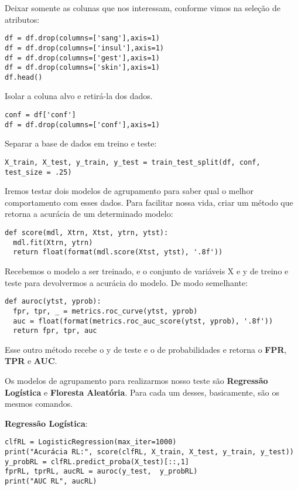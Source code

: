 Deixar somente as colunas que nos interessam, conforme vimos na seleção de atributos:
\begin{lstlisting}
df = df.drop(columns=['sang'],axis=1)
df = df.drop(columns=['insul'],axis=1)
df = df.drop(columns=['gest'],axis=1)
df = df.drop(columns=['skin'],axis=1)
df.head()
\end{lstlisting}

Isolar a coluna alvo e retirá-la dos dados. 
\begin{lstlisting}
conf = df['conf']
df = df.drop(columns=['conf'],axis=1)
\end{lstlisting}

Separar a base de dados em treino e teste:
\begin{lstlisting}
X_train, X_test, y_train, y_test = train_test_split(df, conf, test_size = .25)
\end{lstlisting}

Iremos testar dois modelos de agrupamento para saber qual o melhor comportamento com esses dados. Para facilitar nossa vida, criar um método que retorna a acurácia de um determinado modelo:
\begin{lstlisting}
def score(mdl, Xtrn, Xtst, ytrn, ytst):
  mdl.fit(Xtrn, ytrn)
  return float(format(mdl.score(Xtst, ytst), '.8f'))
\end{lstlisting}

Recebemos o modelo a ser treinado, e o conjunto de variáveis X e y de treino e teste para devolvermos a acurácia do modelo. De modo semelhante:
\begin{lstlisting}
def auroc(ytst, yprob):
  fpr, tpr, _ = metrics.roc_curve(ytst, yprob)
  auc = float(format(metrics.roc_auc_score(ytst, yprob), '.8f'))
  return fpr, tpr, auc 
\end{lstlisting}

Esse outro método recebe o y de teste e o de probabilidades e retorna o \textbf{FPR}, \textbf{TPR} e \textbf{AUC}.

Os modelos de agrupamento para realizarmos nosso teste são \textbf{Regressão Logística} e \textbf{Floresta Aleatória}. Para cada um desses, basicamente, são os mesmos comandos.

\textbf{Regressão Logística}:
\begin{lstlisting}
clfRL = LogisticRegression(max_iter=1000)
print("Acurácia RL:", score(clfRL, X_train, X_test, y_train, y_test))
y_probRL = clfRL.predict_proba(X_test)[::,1]
fprRL, tprRL, aucRL = auroc(y_test,  y_probRL)
print("AUC RL", aucRL)
\end{lstlisting}

